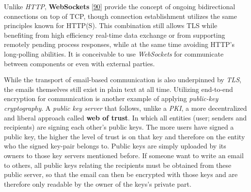 \documentclass[12pt,english,a4paper,titlepage,cleardoublepage=empty,dottedtoc]{report}
\begin{document}
Unlike \emph{HTTP}, \textbf{WebSockets}
{[}\protect\hyperlink{ref-web_spec_websockets}{90}{]} provide the
concept of ongoing bidirectional connections on top of TCP, though
connection establishment utilizes the same principles known for HTTP(S).
This combination still allows TLS while benefiting from high efficiency
real-time data exchange or from supporting remotely pending process
responses, while at the same time avoiding HTTP's long-polling
abilities. It is conceivable to use \emph{WebSockets} for communicate
between components or even with external parties.

While the transport of email-based communication is also underpinned by
\emph{TLS}, the emails themselves still exist in plain text at all time.
Utilizing end-to-end encryption for communication is another example of
applying \emph{public-key cryptography}. A \emph{public key server} that
follows, unlike a \emph{PKI}, a more decentralized and liberal approach
called \textbf{web of trust}. In which all entities (user; senders and
recipients) are signing each other's public keys. The more users have
signed a public key, the higher the level of trust is on that key and
therefore on the entity who the signed key-pair belongs to. Public keys
are simply uploaded by its owners to those key servers mentioned before.
If someone want to write an email to others, all public keys relating
the recipients must be obtained from these public server, so that the
email can then be encrypted with those keys and are therefore only
readable by the owner of the keys's private part.
\end{document}
